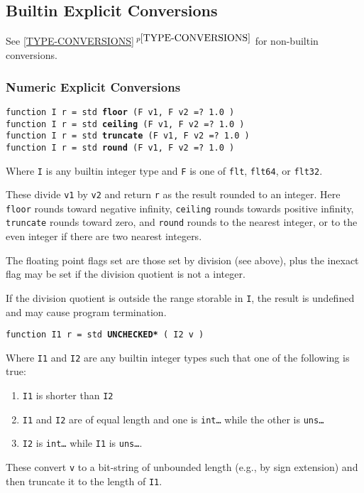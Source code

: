 \documentclass[12pt]{article}
\newcommand{\ttkey}[1]{{\tt \bfseries #1}}
\newcommand{\itemref}[1]{\ref{#1}$\,^{p\pageref{#1}}$}
\newenvironment{indpar}[1][0.3in]%
	{\begin{list}{}%
		     {\setlength{\itemsep}{0in}%
		      \setlength{\topsep}{0in}%
		      \setlength{\parsep}{1ex}%
		      \setlength{\labelwidth}{#1}%
		      \setlength{\leftmargin}{#1}%
		      \addtolength{\leftmargin}{\labelsep}}%
	 \item}%
	{\end{list}}
\begin{document}
\subsection{Builtin Explicit Conversions}
\label{BUILTIN-EXPLICIT-CONVERSIONS}

See \itemref{TYPE-CONVERSIONS} for non-builtin conversions.

\subsubsection{Numeric Explicit Conversions}

{\tt function I r = std \ttkey{floor} (F v1, F v2 =? 1.0 )} \\
{\tt function I r = std \ttkey{ceiling} (F v1, F v2 =? 1.0 )} \\
{\tt function I r = std \ttkey{truncate} (F v1, F v2 =? 1.0 )} \\
{\tt function I r = std \ttkey{round} (F v1, F v2 =? 1.0 )}
\begin{indpar}
Where {\tt I} is any builtin integer type
and {\tt F} is one of {\tt flt}, {\tt flt64}, or {\tt flt32}.

These divide {\tt v1} by {\tt v2} and return {\tt r} as the
result rounded to an integer.
Here {\tt floor} rounds toward negative infinity, {\tt ceiling}
rounds towards positive infinity, {\tt truncate} rounds toward
zero, and {\tt round} rounds to the nearest integer, or to the
even integer if there are two nearest integers.

The floating point flags set are those set by division (see above), plus the
inexact flag may be set if the division quotient is not a integer.

If the division quotient is outside the range storable in {\tt I},
the result is undefined and may cause program termination.
\end{indpar}

{\tt function I1 r = std \ttkey{*UNCHECKED*} ( I2 v )}
\begin{indpar}
Where {\tt I1} and {\tt I2} are any builtin integer types
such that one of the following is true:
\begin{enumerate}
\item {\tt I1} is shorter than {\tt I2}
\item {\tt I1} and {\tt I2} are of equal length and one
is {\tt int\ldots} while the other is {\tt uns\ldots}
\item {\tt I2} is {\tt int\ldots} while {\tt I1} is {\tt uns\ldots}.
\end{enumerate}

These convert {\tt v} to a bit-string of unbounded length (e.g., by
sign extension) and
then truncate it to the length of {\tt I1}.
\end{indpar}
\end{document}
